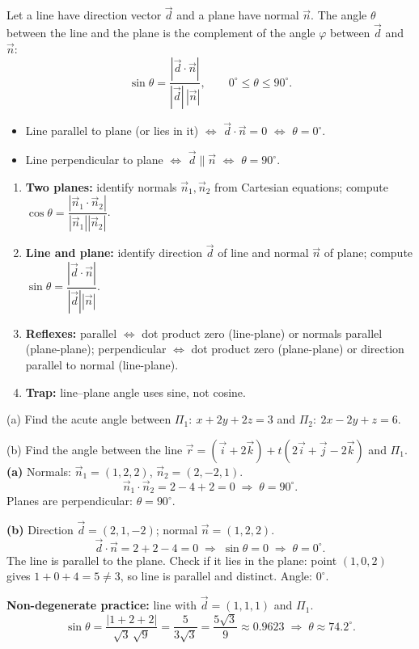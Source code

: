 \documentclass[11pt]{article}
\newcommand{\cle}[1]{{\popxbold\color{popdark}#1}}
\begin{document}
\begin{propriete}
Let a line have direction vector $\vec{d}$ and a plane have normal $\vec{n}$. The angle $\theta$ between the line and the plane is the complement of the angle $\varphi$ between $\vec{d}$ and $\vec{n}$:
\[
\sin\theta=\frac{|\vec{d}\cdot\vec{n}|}{|\vec{d}|\,|\vec{n}|},\qquad 0^\circ\le\theta\le 90^\circ.
\]
\begin{itemize}
\item Line parallel to plane (or lies in it) $\Leftrightarrow$ $\vec{d}\cdot\vec{n}=0$ $\Leftrightarrow$ $\theta=0^\circ$.
\item Line perpendicular to plane $\Leftrightarrow$ $\vec{d}\parallel\vec{n}$ $\Leftrightarrow$ $\theta=90^\circ$.
\end{itemize}
\end{propriete}

\begin{methode}
\begin{enumerate}
\item \textbf{Two planes:} identify normals $\vec{n}_1,\vec{n}_2$ from Cartesian equations; compute $\cos\theta=\dfrac{|\vec{n}_1\cdot\vec{n}_2|}{|\vec{n}_1||\vec{n}_2|}$.
\item \textbf{Line and plane:} identify direction $\vec{d}$ of line and normal $\vec{n}$ of plane; compute $\sin\theta=\dfrac{|\vec{d}\cdot\vec{n}|}{|\vec{d}||\vec{n}|}$.
\item \textbf{Reflexes:} parallel $\Leftrightarrow$ dot product zero (line-plane) or normals parallel (plane-plane); perpendicular $\Leftrightarrow$ dot product zero (plane-plane) or direction parallel to normal (line-plane).
\item \textbf{Trap:} line–plane angle uses \cle{sine}, not cosine.
\end{enumerate}
\end{methode}

\begin{exoresolu}
(a) Find the acute angle between $\Pi_1:\ x+2y+2z=3$ and $\Pi_2:\ 2x-2y+z=6$.

(b) Find the angle between the line $\vec{r}=(\vec{i}+2\vec{k})+t(2\vec{i}+\vec{j}-2\vec{k})$ and $\Pi_1$.
\tcblower
\textbf{(a)} Normals: $\vec{n}_1=(1,2,2)$, $\vec{n}_2=(2,-2,1)$.
\[
\vec{n}_1\cdot\vec{n}_2=2-4+2=0 \;\Longrightarrow\; \theta=90^\circ.
\]
Planes are perpendicular: $\boxed{\theta=90^\circ}$.

\textbf{(b)} Direction $\vec{d}=(2,1,-2)$; normal $\vec{n}=(1,2,2)$.
\[
\vec{d}\cdot\vec{n}=2+2-4=0 \;\Longrightarrow\; \sin\theta=0 \;\Longrightarrow\; \theta=0^\circ.
\]
The line is parallel to the plane. Check if it lies in the plane: point $(1,0,2)$ gives $1+0+4=5\neq3$, so line is parallel and distinct. Angle: $\boxed{0^\circ}$.

\medskip
\textbf{Non-degenerate practice:} line with $\vec{d}=(1,1,1)$ and $\Pi_1$.
\[
\sin\theta=\frac{|1+2+2|}{\sqrt{3}\,\sqrt{9}}=\frac{5}{3\sqrt{3}}=\frac{5\sqrt{3}}{9}\approx 0.9623 \;\Longrightarrow\; \theta\approx 74.2^\circ.
\]
\end{exoresolu}
\end{document}
